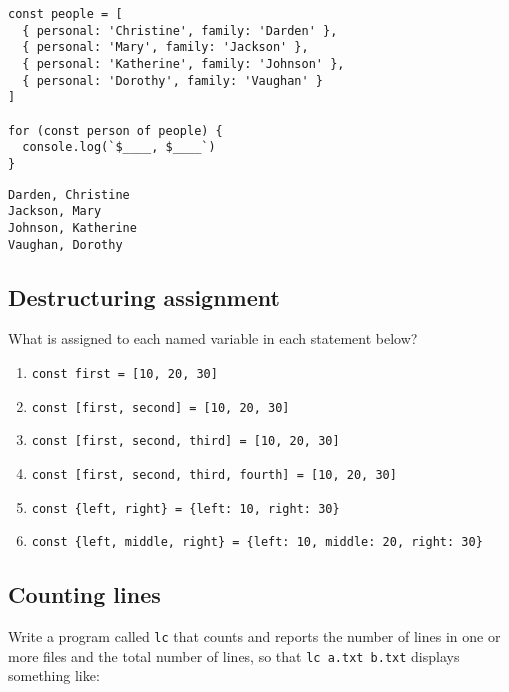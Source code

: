 \documentclass[krantzl]{krantz}
\begin{document}
\begin{lstlisting}[frame=single,frameround=tttt]
const people = [
  { personal: 'Christine', family: 'Darden' },
  { personal: 'Mary', family: 'Jackson' },
  { personal: 'Katherine', family: 'Johnson' },
  { personal: 'Dorothy', family: 'Vaughan' }
]

for (const person of people) {
  console.log(`$____, $____`)
}
\end{lstlisting}



\begin{lstlisting}[frame=single,frameround=tttt]
Darden, Christine
Jackson, Mary
Johnson, Katherine
Vaughan, Dorothy
\end{lstlisting}


\subsection*{Destructuring assignment}


What is assigned to each named variable in each statement below?

\begin{enumerate}

\item \texttt{const first = [10, 20, 30]}

\item \texttt{const [first, second] = [10, 20, 30]}

\item \texttt{const [first, second, third] = [10, 20, 30]}

\item \texttt{const [first, second, third, fourth] = [10, 20, 30]}

\item \texttt{const \{left, right\} = \{left: 10, right: 30\}}

\item \texttt{const \{left, middle, right\} = \{left: 10, middle: 20, right: 30\}}

\end{enumerate}

\subsection*{Counting lines}


Write a program called \texttt{lc} that counts and reports the number of lines in one or more files and the total number of lines,
so that \texttt{lc a.txt b.txt} displays something like:
\end{document}
